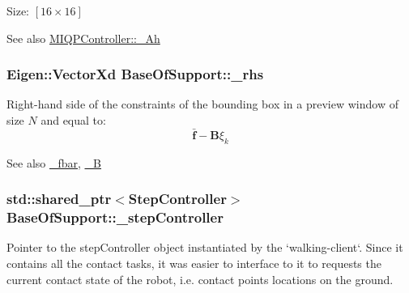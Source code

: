 \-Size\-: $[16\times16]$

\begin{DoxySeeAlso}{\-See also}
\hyperlink{classMIQPController_a388ed1c232c212e171276993b5cb3fec}{\-M\-I\-Q\-P\-Controller\-::\-\_\-\-Ah} 
\end{DoxySeeAlso}
\hypertarget{classBaseOfSupport_a274325bb39f10aac06153b82a2541c3b}{
\subsubsection[{\-\_\-rhs}]{\setlength{\rightskip}{0pt plus 5cm}\-Eigen\-::\-Vector\-Xd {\bf \-Base\-Of\-Support\-::\-\_\-rhs}}}\label{classBaseOfSupport_a274325bb39f10aac06153b82a2541c3b}
\-Right-\/hand side of the constraints of the bounding box in a preview window of size $N$ and equal to\-: \[ \bar{\mathbf{f}} - \mathbf{B}\xi_k \]

\begin{DoxySeeAlso}{\-See also}
\hyperlink{classBaseOfSupport_aa578314a7473867f545b95883beb6c6b}{\-\_\-fbar}, \hyperlink{classBaseOfSupport_a8dd3c63ff193e5722c93307a952178a8}{\-\_\-\-B} 
\end{DoxySeeAlso}
\hypertarget{classBaseOfSupport_a023d28c6900f0e97d9de42ca2c5d94a5}{
\subsubsection[{\-\_\-step\-Controller}]{\setlength{\rightskip}{0pt plus 5cm}std\-::shared\-\_\-ptr$<${\bf \-Step\-Controller}$>$ {\bf \-Base\-Of\-Support\-::\-\_\-step\-Controller}}}\label{classBaseOfSupport_a023d28c6900f0e97d9de42ca2c5d94a5}
\-Pointer to the step\-Controller object instantiated by the `walking-\/client`. \-Since it contains all the contact tasks, it was easier to interface to it to requests the current contact state of the robot, i.\-e. contact points locations on the ground.

